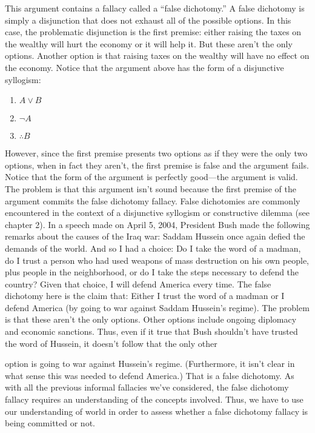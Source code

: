 This argument contains a fallacy called a ``false dichotomy.'' A false dichotomy
is simply a disjunction that does not exhaust all of the possible options. In this
case, the problematic disjunction is the first premise: either raising the taxes on
the wealthy will hurt the economy or it will help it. But these aren't the only
options. Another option is that raising taxes on the wealthy will have no effect
on the economy. Notice that the argument above has the form of a disjunctive
syllogism:
\begin{enumerate}
\item $A \lor B$
\item $\lnot A$
\item $\therefore B$
\end{enumerate}
However, since the first premise presents two options as if they were the only
two options, when in fact they aren't, the first premise is false and the argument
fails. Notice that the form of the argument is perfectly good—the argument is
valid. The problem is that this argument isn't sound because the first premise of
the argument commits the false dichotomy fallacy. False dichotomies are
commonly encountered in the context of a disjunctive syllogism or constructive
dilemma (see chapter 2).
In a speech made on April 5, 2004, President Bush made the following remarks
about the causes of the Iraq war:
Saddam Hussein once again defied the demands of the world. And so I
had a choice: Do I take the word of a madman, do I trust a person who
had used weapons of mass destruction on his own people, plus people in
the neighborhood, or do I take the steps necessary to defend the
country? Given that choice, I will defend America every time.
The false dichotomy here is the claim that:
Either I trust the word of a madman or I defend America (by going to war
against Saddam Hussein's regime).
The problem is that these aren't the only options. Other options include
ongoing diplomacy and economic sanctions. Thus, even if it true that Bush
shouldn't have trusted the word of Hussein, it doesn't follow that the only other

option is going to war against Hussein's regime. (Furthermore, it isn't clear in
what sense this was needed to defend America.) That is a false dichotomy.
As with all the previous informal fallacies we've considered, the false dichotomy
fallacy requires an understanding of the concepts involved. Thus, we have to
use our understanding of world in order to assess whether a false dichotomy
fallacy is being committed or not.

